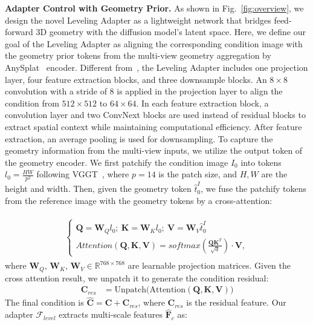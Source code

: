 \noindent\textbf{Adapter Control with Geometry Prior.} As shown in Fig.~\ref{fig:overview}, we design the novel Leveling Adapter as a lightweight network that bridges feed-forward 3D geometry with the diffusion model's latent space. Here, we define our goal of the Leveling Adapter as aligning the corresponding condition image with the geometry prior tokens from the multi-view geometry aggregation by AnySplat~\cite{jiang2025anysplat} encoder. Different from~\cite{mou2024t2i}, the Leveling Adapter includes one projection layer, four feature extraction blocks, and three downsample blocks. An $8\times8$ convolution with a stride of 8 is applied in the projection layer to align the condition from $512\times512$ to $64\times64$. In each feature extraction block, a convolution layer and two ConvNext blocks are used instead of residual blocks to extract spatial context while maintaining computational efficiency. After feature extraction, an average pooling is used for downsampling.
To capture the geometry information from the multi-view inputs, we utilize the output token of the geometry encoder. We first patchify the condition image $I_0$ into tokens $l_0=\frac{HW}{p^2}$ following VGGT~\cite{wang2025vggt}, where $p=14$ is the patch size, and $H, W$ are the height and width. Then, given the geometry token $\hat{t}_0^I$, we fuse the patchify tokens from the reference image with the geometry tokens by a cross-attention:

\begin{align}
\begin{split}
\left \{
\begin{array}{ll}
    \mathbf{Q} = \mathbf{W}_Q l_0;\ \mathbf{K} = \mathbf{W}_K l_0;\ \mathbf{V} = \mathbf{W}_V \hat{t}_0^I\\
    Attention(\mathbf{Q}, \mathbf{K}, \mathbf{V}) = softmax(\frac{\mathbf{Q}\mathbf{K}^T}{\sqrt{d}})\cdot \mathbf{V},
\end{array}
\right.
\end{split}
\end{align}
where $\mathbf{W}_Q$, $\mathbf{W}_K$, $\mathbf{W}_V\in \mathbb{R}^{768\times 768}$ are learnable projection matrices. Given the cross attention result, we unpatch it to generate the condition residual: \begin{equation}
\begin{split}
\mathbf{C}_{res} &= \text{Unpatch}\bigl( 
   \text{Attention}(\mathbf{Q}, \mathbf{K}, \mathbf{V})
\bigr)
\end{split}
\end{equation}The final condition is $\hat{\mathbf{C}}=\mathbf{C}+\mathbf{C}_{res}$, where $\mathbf{C}_{res}$ is the residual feature. Our adapter $\mathcal{F}_{level}$ extracts multi-scale features $\hat{\mathbf{F}}_c$ as:

